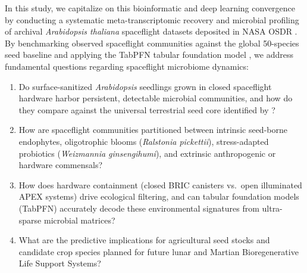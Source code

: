 In this study, we capitalize on this bioinformatic and deep learning convergence by conducting a systematic meta-transcriptomic recovery and microbial profiling of archival \textit{Arabidopsis thaliana} spaceflight datasets deposited in NASA OSDR \citep{barker2023meta}. By benchmarking observed spaceflight communities against the global 50-species seed baseline \citep{simonin2022seed} and applying the TabPFN tabular foundation model \citep{hollmann2025accurate}, we address fundamental questions regarding spaceflight microbiome dynamics:
\begin{enumerate}
    \item Do surface-sanitized \textit{Arabidopsis} seedlings grown in closed spaceflight hardware harbor persistent, detectable microbial communities, and how do they compare against the universal terrestrial seed core identified by \citet{simonin2022seed}?
    \item How are spaceflight communities partitioned between intrinsic seed-borne endophytes, oligotrophic blooms (\textit{Ralstonia pickettii}), stress-adapted probiotics (\textit{Weizmannia ginsengihumi}), and extrinsic anthropogenic or hardware commensals?
    \item How does hardware containment (closed BRIC canisters vs.\ open illuminated APEX systems) drive ecological filtering, and can tabular foundation models (TabPFN) accurately decode these environmental signatures from ultra-sparse microbial matrices?
    \item What are the predictive implications for agricultural seed stocks and candidate crop species planned for future lunar and Martian Bioregenerative Life Support Systems?
\end{enumerate}
